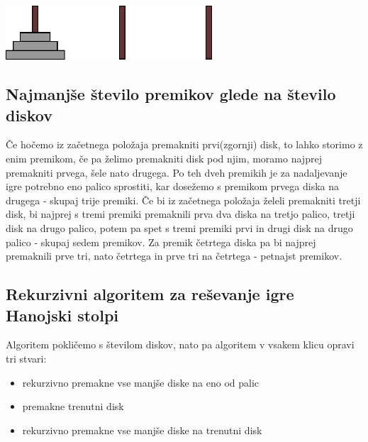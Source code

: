 \documentclass[10pt,a4paper,oneside]{book}
\newenvironment{items}{
\begin{itemize}
  \setlength{\itemsep}{1pt}
  \setlength{\parskip}{0pt}
  \setlength{\parsep}{0pt}
}{\end{itemize}}
\begin{document}
\begin{center}
\includegraphics[width=77mm]{towersOfHanoi}
\end{center}

\subsection{Najmanjše število premikov glede na število diskov}
Če hočemo iz začetnega položaja premakniti prvi(zgornji) disk, to lahko storimo z enim premikom, če pa želimo premakniti disk pod njim, moramo najprej premakniti prvega, šele nato drugega. Po teh dveh premikih je za nadaljevanje igre potrebno eno palico sprostiti, kar dosežemo s premikom prvega diska na drugega - skupaj trije premiki. Če bi iz začetnega položaja želeli premakniti tretji disk, bi najprej s tremi premiki premaknili prva dva diska na tretjo palico, tretji disk na drugo palico, potem pa spet s tremi premiki prvi in drugi disk na drugo palico - skupaj sedem premikov. Za premik četrtega diska pa bi najprej premaknili prve tri, nato četrtega in prve tri na četrtega - petnajst premikov.%


\subsection{Rekurzivni algoritem za reševanje igre Hanojski stolpi}
Algoritem pokličemo s številom diskov, nato pa algoritem v vsakem klicu opravi tri stvari:
\begin{items}
	\item rekurzivno premakne vse manjše diske na eno od palic
	\item premakne trenutni disk
	\item rekurzivno premakne vse manjše diske na trenutni disk
\end{items}

\end{document}
